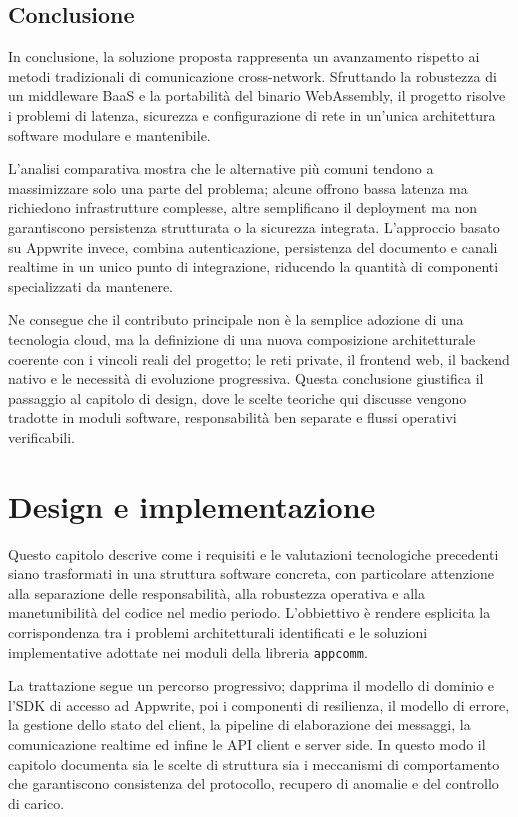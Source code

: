 \documentclass[a4paper, 11pt, twoside]{report}
\begin{document}
\section{Conclusione}

In conclusione, la soluzione proposta rappresenta un avanzamento rispetto ai metodi tradizionali di comunicazione 
cross-network. Sfruttando la robustezza di un middleware BaaS e la portabilità del binario WebAssembly, il progetto 
risolve i problemi di latenza, sicurezza e configurazione di rete in un'unica architettura software modulare e
mantenibile.

L'analisi comparativa mostra che le alternative più comuni tendono a massimizzare solo una parte del problema;
alcune offrono bassa latenza ma richiedono infrastrutture complesse, altre semplificano il deployment ma non
garantiscono persistenza strutturata o la sicurezza integrata. L'approccio basato su Appwrite invece, combina
autenticazione, persistenza del documento e canali realtime in un unico punto di integrazione, riducendo la quantità
di componenti specializzati da mantenere.

Ne consegue che il contributo principale non è la semplice adozione di una tecnologia cloud, ma la definizione di una
nuova composizione architetturale coerente con i vincoli reali del progetto; le reti private, il frontend web, il
backend nativo e le necessità di evoluzione progressiva. Questa conclusione giustifica il passaggio al capitolo di
design, dove le scelte teoriche qui discusse vengono tradotte in moduli software, responsabilità ben separate e
flussi operativi verificabili.

\chapter{Design e implementazione}

Questo capitolo descrive come i requisiti e le valutazioni tecnologiche precedenti siano trasformati in una struttura
software concreta, con particolare attenzione alla separazione delle responsabilità, alla robustezza operativa e alla
manetunibilità del codice nel medio periodo. L'obbiettivo è rendere esplicita la corrispondenza tra i problemi
architetturali identificati e le soluzioni implementative adottate nei moduli della libreria \texttt{appcomm}.

La trattazione segue un percorso progressivo; dapprima il modello di dominio e l'\gls{SDK} di accesso ad Appwrite, poi i
componenti di resilienza, il modello di errore, la gestione dello stato del client, la pipeline di elaborazione dei
messaggi, la comunicazione realtime ed infine le API client e server side. In questo modo il capitolo documenta sia
le scelte di struttura sia i meccanismi di comportamento che garantiscono consistenza del protocollo, recupero di anomalie
e del controllo di carico.
\end{document}
